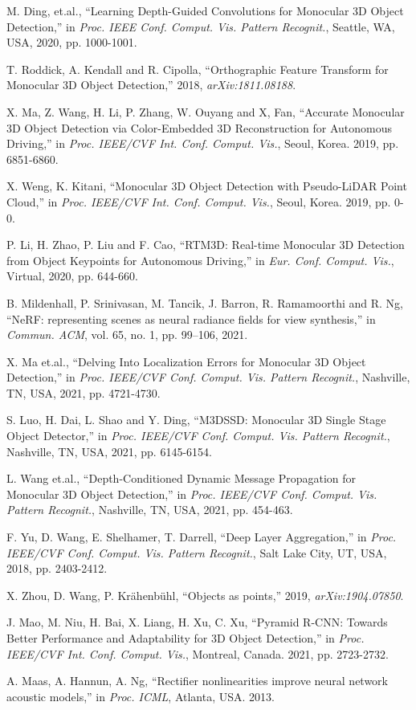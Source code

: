 \documentclass[journal]{IEEEtran}
\begin{document}
\begin{thebibliography}{1}
		M. Ding, et.al., “Learning Depth-Guided Convolutions for Monocular 3D Object Detection,” in \textit{Proc. IEEE Conf. Comput. Vis. Pattern Recognit.}, Seattle, WA, USA, 2020, pp. 1000-1001.
		
		T. Roddick, A. Kendall and R. Cipolla, “Orthographic Feature Transform for Monocular 3D Object Detection,” 2018, \textit{arXiv:1811.08188}.
		
		X. Ma, Z. Wang, H. Li, P. Zhang, W. Ouyang and X, Fan, “Accurate Monocular 3D Object Detection via Color-Embedded 3D Reconstruction for Autonomous Driving,” in \textit{Proc. IEEE/CVF Int. Conf. Comput. Vis.}, Seoul, Korea. 2019, pp. 6851-6860.
		
		X. Weng, K. Kitani, “Monocular 3D Object Detection with Pseudo-LiDAR Point Cloud,” in \textit{Proc. IEEE/CVF Int. Conf. Comput. Vis.}, Seoul, Korea. 2019, pp. 0-0. 
		
		P. Li, H. Zhao, P. Liu and F. Cao, “RTM3D: Real-time Monocular 3D Detection from Object Keypoints for Autonomous Driving,” in \textit{Eur. Conf. Comput. Vis.}, Virtual, 2020, pp. 644-660.
		
		B. Mildenhall, P. Srinivasan, M. Tancik, J. Barron, R. Ramamoorthi and R. Ng, “NeRF: representing scenes as neural radiance fields for view synthesis,” in \textit{Commun. ACM}, vol. 65, no. 1, pp. 99–106, 2021.
		
		X. Ma et.al., “Delving Into Localization Errors for Monocular 3D Object Detection,” in \textit{Proc. IEEE/CVF Conf. Comput. Vis. Pattern Recognit.}, Nashville, TN, USA, 2021, pp. 4721-4730.
		
		S. Luo, H. Dai, L. Shao and Y. Ding, “M3DSSD: Monocular 3D Single Stage Object Detector,” in \textit{Proc. IEEE/CVF Conf. Comput. Vis. Pattern Recognit.}, Nashville, TN, USA, 2021, pp. 6145-6154.
		
		L. Wang et.al., “Depth-Conditioned Dynamic Message Propagation for Monocular 3D Object Detection,” in \textit{Proc. IEEE/CVF Conf. Comput. Vis. Pattern Recognit.}, Nashville, TN, USA, 2021, pp. 454-463.
		
		F. Yu, D. Wang, E. Shelhamer, T. Darrell, “Deep Layer Aggregation,” in \textit{Proc. IEEE/CVF Conf. Comput. Vis. Pattern Recognit.}, 	Salt Lake City, UT, USA, 2018, pp.  2403-2412.
		
		X. Zhou, D. Wang, P. Krähenbühl, “Objects as points,” 2019, \textit{arXiv:1904.07850}.
		
		J. Mao, M. Niu, H. Bai, X. Liang, H. Xu, C. Xu, “Pyramid R-CNN: Towards Better Performance and Adaptability for 3D Object Detection,” in \textit{Proc. IEEE/CVF Int. Conf. Comput. Vis.}, Montreal, Canada. 2021, pp. 2723-2732. 
		
		A. Maas, A. Hannun, A. Ng, “Rectifier nonlinearities improve neural network acoustic models,” in \textit{Proc. ICML}, 	Atlanta, USA. 2013. 
		
		
		
	\end{thebibliography}
\end{document}
